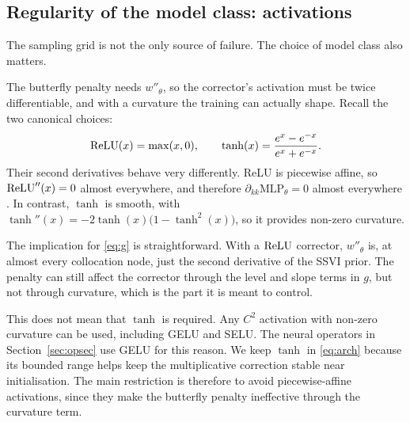 \subsection{Regularity of the model class: activations}

The sampling grid is not the only source of failure. The choice of model class also matters.

The butterfly penalty needs $w''_\theta$, so the corrector's activation must be twice
differentiable, and with a curvature the training can actually shape. Recall the two canonical
choices:
\begin{equation}\label{eq:activations}
\operatorname{ReLU}(x)=\max(x,0),
\qquad
\tanh(x)=\frac{e^{x}-e^{-x}}{e^{x}+e^{-x}} .
\end{equation}
Their second derivatives behave very differently. ReLU is piecewise affine, so
$\operatorname{ReLU}''(x)=0$ almost everywhere, and therefore
$\partial_{kk}\mathrm{MLP}_\theta=0$ almost everywhere
\cite{hornik1991,baydin2018}. In contrast, $\tanh$ is smooth, with
$\tanh''(x)=-2\tanh(x)\bigl(1-\tanh^2(x)\bigr)$, so it provides non-zero curvature.

The implication for \eqref{eq:g} is straightforward. With a $\operatorname{ReLU}$ corrector, $w''_\theta$ is, at almost every collocation node, just the second derivative of the SSVI prior. The penalty can still affect the corrector through the level and slope terms in $g$, but not through curvature, which is the part it is meant to control.

This does not mean that $\tanh$ is required. Any $C^2$ activation with non-zero curvature can be used, including GELU and SELU. The neural operators in Section~\ref{sec:opsec} use GELU for this reason. We keep $\tanh$ in \eqref{eq:arch} because its bounded range helps keep the multiplicative correction stable near initialisation. The main restriction is therefore to avoid piecewise-affine activations, since they make the butterfly penalty ineffective through the curvature term.


